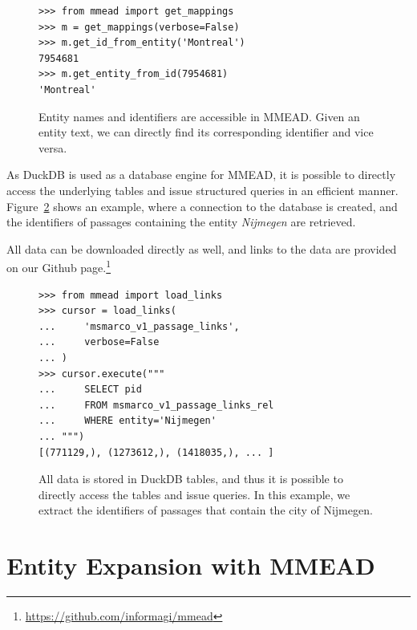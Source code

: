 \begin{figure}
	\begin{verbatim}
>>> from mmead import get_mappings
>>> m = get_mappings(verbose=False)
>>> m.get_id_from_entity('Montreal')
7954681
>>> m.get_entity_from_id(7954681)
'Montreal'
	\end{verbatim}
	\caption{Entity names and identifiers are accessible in MMEAD. Given an entity text, we can directly find its corresponding identifier and vice versa.}
	\label{fig:load_mappings}
\end{figure}

As DuckDB is used as a database engine for MMEAD, it is possible to directly access the underlying tables and issue structured queries in an efficient manner. Figure~\ref{fig:sql_engine} shows an example, where a connection to the database is created, and the identifiers of passages containing the entity \emph{Nijmegen} are retrieved.

All data can be downloaded directly as well, and links to the data are provided on our Github page.\footnote{\url{https://github.com/informagi/mmead}}

\begin{figure}
	\begin{verbatim}
>>> from mmead import load_links
>>> cursor = load_links(
...     'msmarco_v1_passage_links',
...     verbose=False
... )
>>> cursor.execute("""
...     SELECT pid 
...     FROM msmarco_v1_passage_links_rel 
...     WHERE entity='Nijmegen'
... """)
[(771129,), (1273612,), (1418035,), ... ]
	\end{verbatim}
	\caption{All data is stored in DuckDB tables, and thus it is possible to directly access the tables and issue queries. In this example, we extract the identifiers of passages that contain the city of Nijmegen.}
	\label{fig:sql_engine}
\end{figure}

\section{Entity Expansion with MMEAD}

